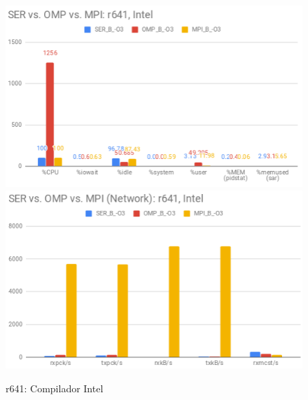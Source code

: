 \documentclass{article}
\begin{document}
\begin{appendices}
\begin{figure}[H]
    \centering
    \includegraphics[width=12cm]{Pictures/LUMZ_SER_OMP_MPI_r641_Intel_Comp.png}
    \includegraphics[width=12cm]{Pictures/LUMZ_SER_OMP_MPI_r641_Intel_Comm.png}
    \caption{r641: Compilador Intel}
    \label{fig:lumz_ser_omp_mpi_r641_intel}
\end{figure}


\end{appendices}
\end{document}
